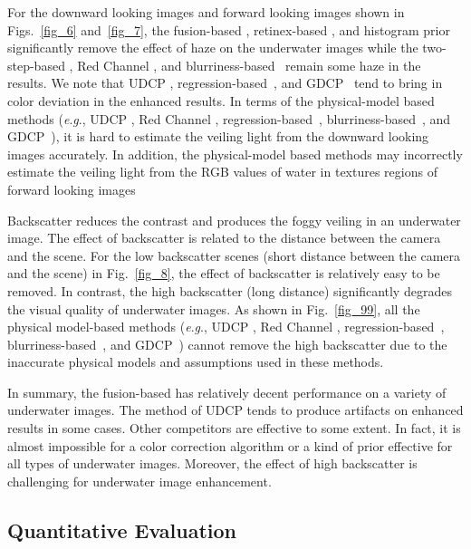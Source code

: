 \documentclass[journal]{IEEEtran}
\newcommand{\eg}{\textit{e}.\textit{g}.}
\begin{document}
For the downward looking images and forward looking images shown in Figs.~\ref{fig_6} and~\ref{fig_7}, the fusion-based \cite{Ancuti2012}, retinex-based \cite{Fu2014}, and histogram prior~\cite{Li2016} significantly remove the effect of haze on the underwater images while the  two-step-based \cite{Fu2017}, Red Channel \cite{Galdran2015}, and blurriness-based~\cite{Peng2017} remain some haze in the results. We note that UDCP \cite{Drews2016}, regression-based~\cite{Li2017prl}, and  GDCP~\cite{Peng2018} tend to bring in color deviation in the enhanced results. In terms of the physical-model based methods (\eg,  UDCP \cite{Drews2016}, Red Channel \cite{Galdran2015}, regression-based~\cite{Li2017prl}, blurriness-based~\cite{Peng2017}, and GDCP~\cite{Peng2018}), it is hard to estimate the veiling light from the downward looking images accurately. In addition, the physical-model based methods may incorrectly estimate the veiling light from the RGB values of water in textures regions of forward looking images


Backscatter reduces the contrast and produces the foggy veiling in an underwater image. The effect of backscatter is related to the distance between the camera and the scene. For the low backscatter scenes (short distance between the camera and the scene) in Fig.~\ref{fig_8}, the effect of backscatter is relatively easy to be removed. In contrast, the high backscatter (long distance) significantly degrades the visual quality of underwater images. As shown in Fig.~\ref{fig_99}, all the physical model-based methods (\eg,  UDCP \cite{Drews2016}, Red Channel \cite{Galdran2015}, regression-based~\cite{Li2017prl}, blurriness-based~\cite{Peng2017}, and GDCP~\cite{Peng2018}) cannot remove the high backscatter due to the inaccurate physical models and assumptions used in these methods.


In summary, the fusion-based \cite{Ancuti2012} has relatively decent performance on a variety of underwater images. The method of UDCP \cite{Drews2016} tends to produce artifacts on enhanced results in some cases. Other competitors are effective to some extent. In fact, it is almost impossible for a color correction algorithm or a kind of prior effective for all types of underwater images. Moreover, the effect of high backscatter is challenging for underwater image enhancement.



\subsection{Quantitative Evaluation}
\end{document}
